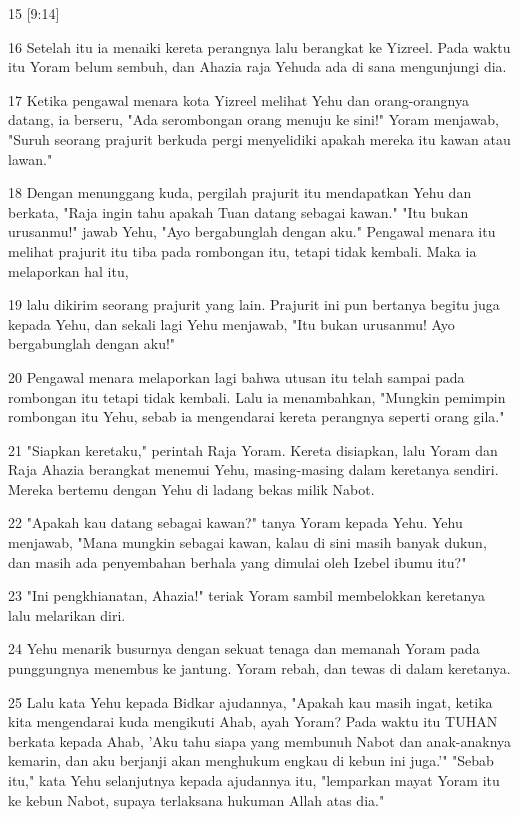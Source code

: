 \par 15 [9:14]
\par 16 Setelah itu ia menaiki kereta perangnya lalu berangkat ke Yizreel. Pada waktu itu Yoram belum sembuh, dan Ahazia raja Yehuda ada di sana mengunjungi dia.
\par 17 Ketika pengawal menara kota Yizreel melihat Yehu dan orang-orangnya datang, ia berseru, "Ada serombongan orang menuju ke sini!" Yoram menjawab, "Suruh seorang prajurit berkuda pergi menyelidiki apakah mereka itu kawan atau lawan."
\par 18 Dengan menunggang kuda, pergilah prajurit itu mendapatkan Yehu dan berkata, "Raja ingin tahu apakah Tuan datang sebagai kawan." "Itu bukan urusanmu!" jawab Yehu, "Ayo bergabunglah dengan aku." Pengawal menara itu melihat prajurit itu tiba pada rombongan itu, tetapi tidak kembali. Maka ia melaporkan hal itu,
\par 19 lalu dikirim seorang prajurit yang lain. Prajurit ini pun bertanya begitu juga kepada Yehu, dan sekali lagi Yehu menjawab, "Itu bukan urusanmu! Ayo bergabunglah dengan aku!"
\par 20 Pengawal menara melaporkan lagi bahwa utusan itu telah sampai pada rombongan itu tetapi tidak kembali. Lalu ia menambahkan, "Mungkin pemimpin rombongan itu Yehu, sebab ia mengendarai kereta perangnya seperti orang gila."
\par 21 "Siapkan keretaku," perintah Raja Yoram. Kereta disiapkan, lalu Yoram dan Raja Ahazia berangkat menemui Yehu, masing-masing dalam keretanya sendiri. Mereka bertemu dengan Yehu di ladang bekas milik Nabot.
\par 22 "Apakah kau datang sebagai kawan?" tanya Yoram kepada Yehu. Yehu menjawab, "Mana mungkin sebagai kawan, kalau di sini masih banyak dukun, dan masih ada penyembahan berhala yang dimulai oleh Izebel ibumu itu?"
\par 23 "Ini pengkhianatan, Ahazia!" teriak Yoram sambil membelokkan keretanya lalu melarikan diri.
\par 24 Yehu menarik busurnya dengan sekuat tenaga dan memanah Yoram pada punggungnya menembus ke jantung. Yoram rebah, dan tewas di dalam keretanya.
\par 25 Lalu kata Yehu kepada Bidkar ajudannya, "Apakah kau masih ingat, ketika kita mengendarai kuda mengikuti Ahab, ayah Yoram? Pada waktu itu TUHAN berkata kepada Ahab, 'Aku tahu siapa yang membunuh Nabot dan anak-anaknya kemarin, dan aku berjanji akan menghukum engkau di kebun ini juga.'" "Sebab itu," kata Yehu selanjutnya kepada ajudannya itu, "lemparkan mayat Yoram itu ke kebun Nabot, supaya terlaksana hukuman Allah atas dia."
